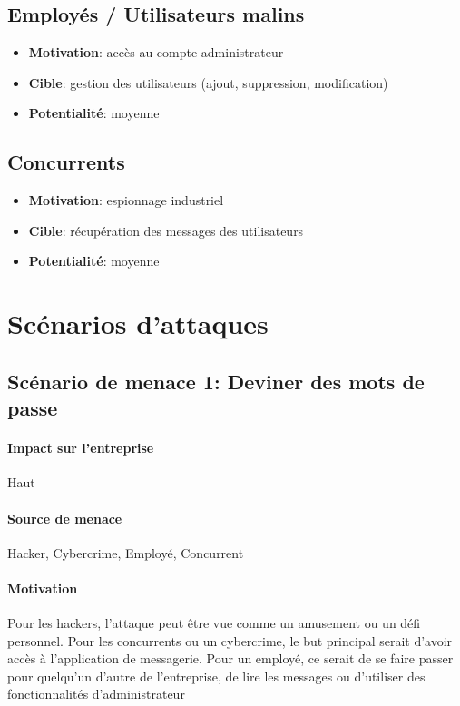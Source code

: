 \documentclass[a4paper,10pt]{article}
\begin{document}
    \subsection*{Employés / Utilisateurs malins}
    \begin{onehalfspacing}
    \begin{itemize}
     \item \textbf{Motivation}: accès au compte administrateur
     \item \textbf{Cible}: gestion des utilisateurs (ajout, suppression, modification)
     \item \textbf{Potentialité}: moyenne
    \end{itemize}
    \end{onehalfspacing}
    \subsection*{Concurrents}
    \begin{onehalfspacing}
    \begin{itemize}
     \item \textbf{Motivation}: espionnage industriel
     \item \textbf{Cible}: récupération des messages des utilisateurs
     \item \textbf{Potentialité}: moyenne
    \end{itemize}
    \end{onehalfspacing}
    \section*{Scénarios d'attaques}
    \subsection*{Scénario de menace 1: Deviner des mots de passe}
        \paragraph{Impact sur l'entreprise} Haut
        \paragraph{Source de menace} Hacker, Cybercrime, Employé, Concurrent
        \paragraph{Motivation} Pour les hackers, l'attaque peut être vue comme un amusement ou un défi personnel. Pour les concurrents ou un cybercrime, le but principal serait d’avoir accès à l’application de messagerie. Pour un employé, ce serait de se faire passer pour quelqu’un d’autre de l’entreprise, de lire les messages ou d’utiliser des fonctionnalités d’administrateur
\end{document}
